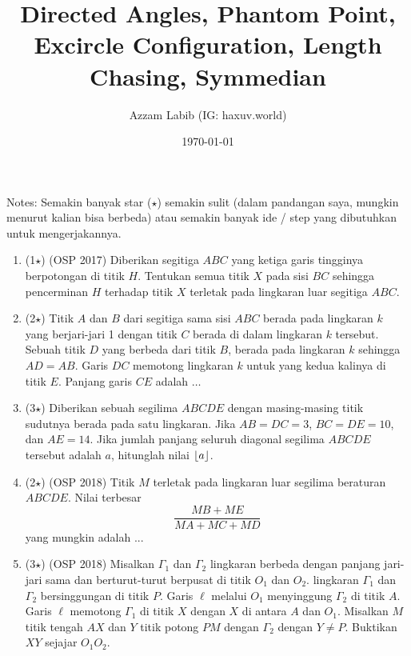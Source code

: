 \documentclass[12pt]{scrartcl}
\title{Directed Angles, Phantom Point, Excircle Configuration, Length Chasing, Symmedian}
\author{Azzam Labib (IG: haxuv.world)}
\date{\today}
\begin{document}
\maketitle

\renewcommand*\contentsname{Daftar Isi}
\tableofcontents

\newpage

Notes: Semakin banyak star ($\star$) semakin sulit (dalam pandangan saya, mungkin menurut kalian bisa berbeda) atau semakin banyak ide / step yang dibutuhkan untuk mengerjakannya.

\begin{enumerate}
    \item (1$\star$) (OSP 2017) Diberikan segitiga $ABC$ yang ketiga garis tingginya berpotongan di titik $H$. Tentukan semua titik $X$ pada sisi $BC$ sehingga pencerminan $H$ terhadap titik $X$ terletak pada lingkaran luar segitiga $ABC$.
    
    \item (2$\star$) Titik $A$ dan $B$ dari segitiga sama sisi $ABC$ berada pada lingkaran $k$ yang berjari-jari 1 dengan titik $C$ berada di dalam lingkaran $k$ tersebut. Sebuah titik $D$ yang berbeda dari titik $B$, berada pada lingkaran $k$ sehingga $AD=AB$. Garis $DC$ memotong lingkaran $k$ untuk yang kedua kalinya di titik $E$. Panjang garis $CE$ adalah $\dots$ %

    \item (3$\star$) Diberikan sebuah segilima $ABCDE$ dengan masing-masing titik sudutnya berada pada satu lingkaran. Jika $AB=DC=3$, $BC=DE=10$, dan $AE=14$. Jika jumlah panjang seluruh diagonal segilima $ABCDE$ tersebut adalah $a$, hitunglah nilai $\left\lfloor a \right\rfloor$.

    \item (2$\star$) (OSP 2018) Titik $M$ terletak pada lingkaran luar segilima beraturan $ABCDE$. Nilai terbesar
    \[
    \frac{MB+ME}{MA+MC+MD}
    \]
    yang mungkin adalah ...

    \item (3$\star$) (OSP 2018) Misalkan $\Gamma_1$ dan $\Gamma_2$ lingkaran berbeda dengan panjang jari-jari sama dan berturut-turut berpusat di titik $O_1$ dan $O_2$. lingkaran $\Gamma_1$ dan $\Gamma_2$ bersinggungan di titik $P$. Garis $\ell$ melalui $O_1$ menyinggung $\Gamma_2$ di titik $A$. Garis $\ell$ memotong $\Gamma_1$ di titik $X$ dengan $X$ di antara $A$ dan $O_1$. Misalkan $M$ titik tengah $AX$ dan $Y$ titik potong $PM$ dengan $\Gamma_2$ dengan $Y \neq P$. Buktikan $XY$ sejajar $O_1O_2$.


\end{enumerate}
\end{document}
